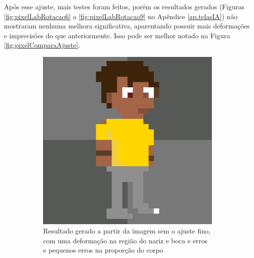 \begin{figure}[htbp]
\end{figure}

Após esse ajuste, mais testes foram feitos, porém os resultados gerados (Figuras \ref{fig:pixelLabRotacao6} a \ref{fig:pixelLabRotacao9} no Apêndice \ref{ap.telasIA}) não mostraram nenhuma melhora significativa, aparentando possuir mais deformações e imprecisões do que anteriormente. Isso pode ser melhor notado na Figura \ref{fig:pixelComparaAjuste}.

\begin{figure}[htbp]
    \centering
    \caption{\small Comparação de resultados antes e depois do ajuste fino}
    \label{fig:pixelComparaAjuste}
    \begin{subfigure}{0.45\linewidth}
        \centering
        \includegraphics[width=1\linewidth]{figs/pixelLab/dia2/rot45res4.PNG}
        \caption{\small Resultado gerado a partir da imagem sem o ajuste fino, com uma deformação na região do nariz e boca e erros e pequenos erros na proporção do corpo}
        \label{fig:pixelComparaAjusteAntes}
    \end{subfigure}
    \begin{subfigure}{0.45\linewidth}
        \centering

\end{subfigure}
\end{figure}
